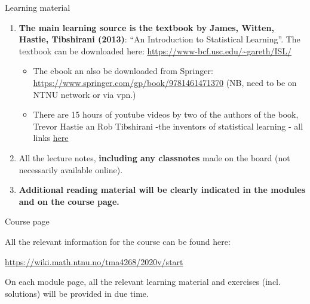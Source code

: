 \documentclass[10pt,ignorenonframetext,]{beamer}
\begin{document}
\begin{frame}{Learning material}

\begin{enumerate}
\def\labelenumi{\arabic{enumi})}
\item
  \textbf{The main learning source is the textbook by James, Witten, Hastie, Tibshirani (2013)}:
  ``An Introduction to Statistical Learning''. The textbook can be
  downloaded here: \url{https://www-bcf.usc.edu/~gareth/ISL/}

  \begin{itemize}
  \item
    The ebook an also be downloaded from Springer:
    \url{https://www.springer.com/gp/book/9781461471370} (NB, need to be
    on NTNU network or via vpn.)
  \item
    There are 15 hours of youtube videos by two of the authors of the
    book, Trevor Hastie an Rob Tibshirani -the inventors of statistical
    learning - all links
    \href{https://www.r-bloggers.com/in-depth-introduction-to-machine-learning-in-15-hours-of-expert-videos/}{here}
  \end{itemize}
\item
  All the lecture notes, \textbf{including any classnotes} made on the
  board (not necessarily available online).
\item
  \textbf{Additional reading material will be clearly indicated in the modules and on the course page.}
\end{enumerate}

\end{frame}

\begin{frame}{Course page}

All the relevant information for the course can be found here:

\url{https://wiki.math.ntnu.no/tma4268/2020v/start}

On each module page, all the relevant learning material and exercises
(incl. solutions) will be provided in due time.

\end{frame}
\end{document}
